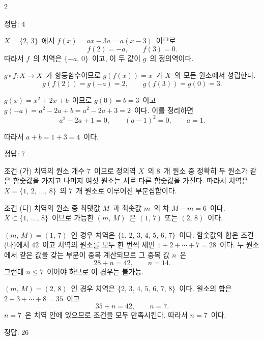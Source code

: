 \documentclass[10pt,fleqn]{article}
\begin{document}
\dmsoltitlefirsttrue
\begin{multicols*}{2}

\begin{dmanswerbox}
정답: $4$
\end{dmanswerbox}

$X = \{2,\, 3\}$\ 에서 $f(x) = ax - 3a = a(x - 3)$\ 이므로
\[ f(2) = -a,\qquad f(3) = 0. \]
따라서 $f$\ 의 치역은 $\{-a,\, 0\}$\ 이고, 이 두 값이 $g$\ 의 정의역이다.

$g \circ f : X \to X$\ 가 항등함수이므로 $g(f(x)) = x$\ 가 $X$\ 의 모든 원소에서 성립한다.
\[ g(f(2)) = g(-a) = 2,\qquad g(f(3)) = g(0) = 3. \]

$g(x) = x^{2} + 2x + b$\ 이므로 $g(0) = b = 3$\ 이고 $g(-a) = a^{2} - 2a + b = a^{2} - 2a + 3 = 2$\ 이다. 이를 정리하면
\[ a^{2} - 2a + 1 = 0,\qquad (a - 1)^{2} = 0,\qquad a = 1. \]

따라서 $a + b = 1 + 3 = 4$\ 이다.
\begin{dmanswerbox}
정답: $7$
\end{dmanswerbox}

조건 (가) 치역의 원소 개수 $7$\ 이므로 정의역 $X$\ 의 $8$\ 개 원소 중 정확히 두 원소가 같은 함숫값을 가지고 나머지 여섯 원소는 서로 다른 함숫값을 가진다. 따라서 치역은 $X = \{1,\, 2,\, \ldots,\, 8\}$\ 의 $7$\ 개 원소로 이루어진 부분집합이다.

조건 (다) 치역의 원소 중 최댓값 $M$\ 과 최솟값 $m$\ 의 차 $M - m = 6$\ 이다. $X \subset \{1,\, \ldots,\, 8\}$\ 이므로 가능한 $(m,\, M)$\ 은 $(1,\, 7)$ 또는 $(2,\, 8)$\ 이다.

$(m,\, M) = (1,\, 7)$\ 인 경우 치역은 $\{1,\, 2,\, 3,\, 4,\, 5,\, 6,\, 7\}$\ 이다. 함숫값의 합은 조건 (나)에서 $42$\ 이고 치역의 원소를 모두 한 번씩 세면 $1 + 2 + \cdots + 7 = 28$\ 이다. 두 원소에서 같은 값을 갖는 부분이 중복 계산되므로 그 중복 값 $n$\ 은
\[ 28 + n = 42,\qquad n = 14. \]
그런데 $n \le 7$\ 이어야 하므로 이 경우는 불가능.

$(m,\, M) = (2,\, 8)$\ 인 경우 치역은 $\{2,\, 3,\, 4,\, 5,\, 6,\, 7,\, 8\}$\ 이다. 원소의 합은 $2 + 3 + \cdots + 8 = 35$\ 이고
\[ 35 + n = 42,\qquad n = 7. \]
$n = 7$\ 은 치역 안에 있으므로 조건을 모두 만족시킨다. 따라서 $n = 7$\ 이다.
\begin{dmanswerbox}
정답: $26$
\end{dmanswerbox}


\end{multicols*}
\end{document}
